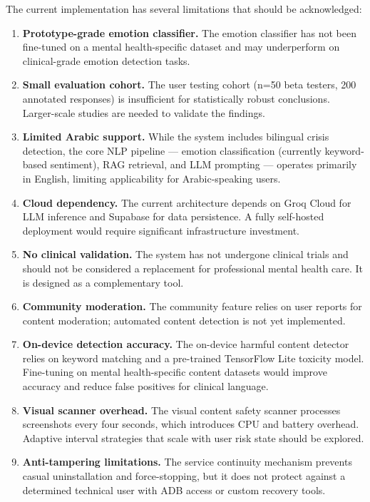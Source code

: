 \documentclass[
  letterpaper,
  12pt,
  a4paper,
  openany]{report}
\begin{document}
The current implementation has several limitations that should be
acknowledged:

\begin{enumerate}
\def\labelenumi{\arabic{enumi}.}
\item
  \textbf{Prototype-grade emotion classifier.} The emotion classifier
  has not been fine-tuned on a mental health-specific dataset and may
  underperform on clinical-grade emotion detection tasks.
\item
  \textbf{Small evaluation cohort.} The user testing cohort (n=50 beta
  testers, 200 annotated responses) is insufficient for statistically
  robust conclusions. Larger-scale studies are needed to validate the
  findings.
\item
  \textbf{Limited Arabic support.} While the system includes bilingual
  crisis detection, the core NLP pipeline --- emotion classification
  (currently keyword-based sentiment), RAG retrieval, and LLM prompting
  --- operates primarily in English, limiting applicability for
  Arabic-speaking users.
\item
  \textbf{Cloud dependency.} The current architecture depends on Groq
  Cloud for LLM inference and Supabase for data persistence. A fully
  self-hosted deployment would require significant infrastructure
  investment.
\item
  \textbf{No clinical validation.} The system has not undergone clinical
  trials and should not be considered a replacement for professional
  mental health care. It is designed as a complementary tool.
\item
  \textbf{Community moderation.} The community feature relies on user
  reports for content moderation; automated content detection is not yet
  implemented.
\item
  \textbf{On-device detection accuracy.} The on-device harmful content
  detector relies on keyword matching and a pre-trained TensorFlow Lite
  toxicity model. Fine-tuning on mental health-specific content datasets
  would improve accuracy and reduce false positives for clinical
  language.
\item
  \textbf{Visual scanner overhead.} The visual content safety scanner
  processes screenshots every four seconds, which introduces CPU and
  battery overhead. Adaptive interval strategies that scale with user
  risk state should be explored.
\item
  \textbf{Anti-tampering limitations.} The service continuity mechanism
  prevents casual uninstallation and force-stopping, but it does not
  protect against a determined technical user with ADB access or custom
  recovery tools.
\end{enumerate}
\end{document}
